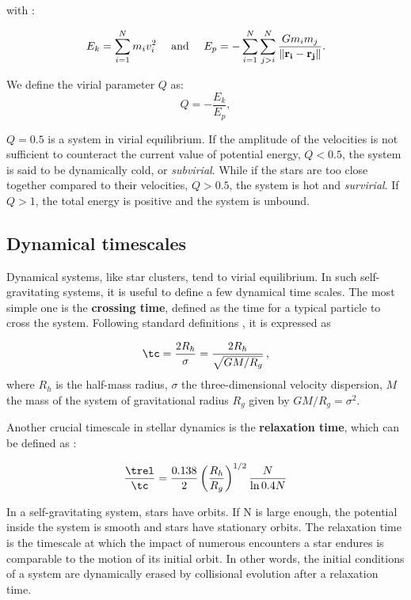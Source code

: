 with :

\begin{equation}
 E_k = \sum_{i=1}^N m_i v_i^2 ~~~~\textrm{and}~~~~ E_p = - \sum_{i=1}^N \sum_{j>i}^N \frac{G m_i m_j}{\| \bold{r_i} - \bold{r_j}\| } .
\end{equation}

We define the virial parameter $Q$ as:
\begin{equation}
Q = - \frac{E_k}{E_p},
\end{equation}

$Q=0.5$ is a system in virial equilibrium. If the amplitude of the velocities is not sufficient to counteract the current value of potential energy, $Q<0.5$, the system is said to be dynamically cold, or \textit{subvirial}. While if the stars are too close together compared to their velocities, $Q>0.5$, the system is hot and \textit{survirial}. If $Q>1$, the total energy is positive and the system is unbound. 


\subsection{Dynamical timescales}
\label{Sub:0_timescales}

Dynamical systems, like star clusters, tend to virial equilibrium. In such self-gravitating systems, it is useful to define a few dynamical time scales. The most simple one is the \textbf{crossing time}, defined as the time for a typical particle to cross the system. Following standard definitions \citep{Meylan1997,Fleck2006}, it is expressed as 

\begin{equation}
\label{Eq:0_tcr}
     \tc = \frac{2R_h}{\sigma} = \frac{2 R_h}{\sqrt{GM/R_g} } \, ,
\end{equation}
where $R_h$ is the half-mass radius, $\sigma$ the three-dimensional velocity dispersion, $M$ the mass of the system of gravitational radius $R_g$ given by $GM / R_g = \sigma^2$. 

Another crucial timescale in stellar dynamics is the \textbf{relaxation time}, which can be defined as \citep{Heggie2003}:

\begin{equation} 
\label{Eq:0_trel}
\frac{\trel}{\tc} = \frac{0.138}{2} \left(\frac{R_h}{R_g}\right)^{1/2} \frac{N}{\ln 0.4 N}  
\end{equation}

In a self-gravitating system, stars have orbits. If N is large enough, the potential inside the system is smooth and stars have stationary orbits. The relaxation time is the timescale at which the impact of numerous encounters a star endures is comparable to the motion of its initial orbit. In other words, the initial conditions of a system are dynamically erased by collisional evolution after a relaxation time.

